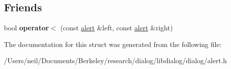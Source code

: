 \subsection*{Friends}
\begin{DoxyCompactItemize}
\item 
\mbox{\label{structdialog_1_1monitor_1_1alert_a43a339406d77cab37f40aeef23d9d52e}} 
bool {\bfseries operator$<$} (const \hyperlink{structdialog_1_1monitor_1_1alert}{alert} \&left, const \hyperlink{structdialog_1_1monitor_1_1alert}{alert} \&right)
\end{DoxyCompactItemize}


The documentation for this struct was generated from the following file\+:\begin{DoxyCompactItemize}
\item 
/\+Users/neil/\+Documents/\+Berkeley/research/dialog/libdialog/dialog/alert.\+h\end{DoxyCompactItemize}
